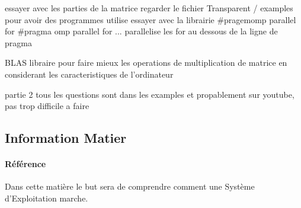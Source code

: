 \documentclass{article}
\begin{document}
essayer avec les parties de la matrice
regarder le fichier Transparent / examples pour avoir des programmes utilise
essayer avec la librairie #pragemomp parallel for
#pragma omp parallel for ... parallelise les for au dessous de la ligne de pragma


BLAS libraire pour faire mieux les operations de multiplication de matrice en considerant les caracteristiques de l'ordinateur



partie 2
tous les questions sont dans les examples et propablement sur youtube, pas trop difficile a faire


\subsection{Information Matier}
\paragraph{Référence}Dans cette matière le but sera de comprendre comment une Système d'Exploitation marche.
\end{document}
